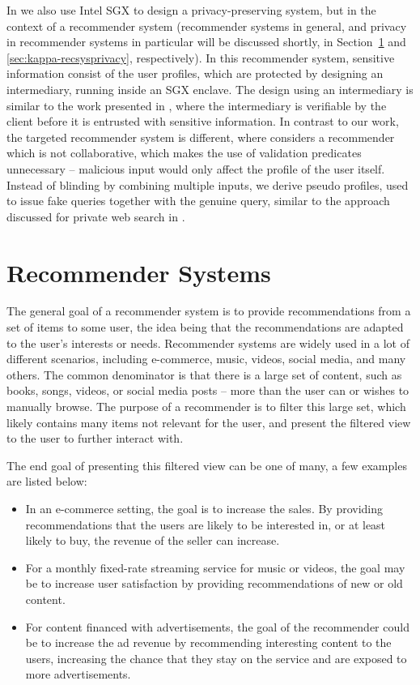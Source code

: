 In  we also use Intel SGX to design a privacy-preserving system, but in the context of a recommender system (recommender systems in general, and privacy in recommender systems in particular will be discussed shortly, in Section~\ref{sec:kappa-recommendersystems} and \ref{sec:kappa-recsysprivacy}, respectively).
In this recommender system, sensitive information consist of the user profiles, which are protected by designing an intermediary, running inside an SGX enclave.
The design using an intermediary is similar to the work presented in \cite{lie:2017}, where the intermediary is verifiable by the client before it is entrusted with sensitive information.
In contrast to our work, the targeted recommender system is different, where  considers a recommender which is not collaborative, which makes the use of validation predicates unnecessary -- malicious input would only affect the profile of the user itself.
Instead of blinding by combining multiple inputs, we derive pseudo profiles, used to issue fake queries together with the genuine query, similar to the approach discussed for private web search in \cite{mokhtar:2017}.

\newpage
\section{Recommender Systems}
\label{sec:kappa-recommendersystems}

The general goal of a recommender system is to provide recommendations from a set of items to some user, the idea being that the recommendations are adapted to the user's interests or needs.
Recommender systems are widely used in a lot of different scenarios, including e-commerce, music, videos, social media, and many others.
The common denominator is that there is a large set of content, such as books, songs, videos, or social media posts -- more than the user can or wishes to manually browse.
The purpose of a recommender is to filter this large set, which likely contains many items not relevant for the user, and present the filtered view to the user to further interact with.

The end goal of presenting this filtered view can be one of many, a few examples are listed below:
\begin{itemize}
	\item In an e-commerce setting, the goal is to increase the sales.
	By providing recommendations that the users are likely to be interested in, or at least likely to buy, the revenue of the seller can increase.
	\item For a monthly fixed-rate streaming service for music or videos, the goal may be to increase user satisfaction by providing recommendations of new or old content.
	\item For content financed with advertisements, the goal of the recommender could be to increase the ad revenue by recommending interesting content to the users, increasing the chance that they stay on the service and are exposed to more advertisements.
\end{itemize}

